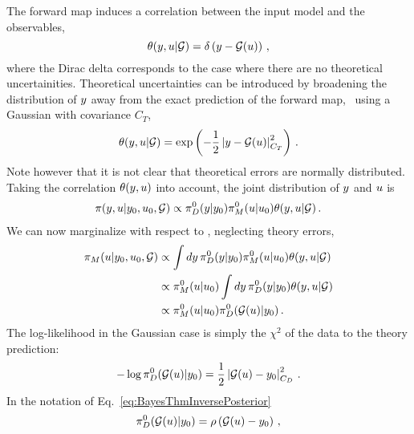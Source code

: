 The forward map induces a correlation between the input model and the
observables, 
\begin{equation}
  \label{eq:ThetaCorr}
  \theta(y,u|\mathcal{G}) = \delta\left(y - \mathcal{G}(u)\right)\, ,
\end{equation}
where the Dirac delta corresponds to the case where there are no theoretical
uncertainities. Theoretical uncertainties can be introduced by broadening the
distribution of $y$ away from the exact prediction of the forward map, \eg\
using a Gaussian with covariance $C_T$,
\begin{equation}
  \label{eq:TheoryErrors}
  \theta(y,u|\mathcal{G}) = \exp\left(
    -\frac12 
    \left| y - \mathcal{G}(u)
    \right|_{C_T}^2\right)\, .
\end{equation}
Note however that it is not clear that theoretical errors are normally
distributed. Taking the correlation $\theta(y,u)$ into account, the joint
distribution of $y$ and $u$ is
\begin{align}
  \label{eq:JointYAndU}
  \pi(y,u|y_0,u_0,\mathcal{G}) \propto 
  \pi_{D}^0(y|y_0) \pi_{M}^0(u|u_0) \theta(y,u|\mathcal{G})\, .
\end{align}
We can now marginalize with respect to \obs, neglecting theory errors, 
\begin{align}
  \label{eq:MarginOne}
  \pi_M(u|y_0,u_0,\mathcal{G}) 
  &\propto \int dy\, \pi_{D}^0(y|y_0) \pi_{M}^0(u|u_0) 
    \theta(y,u|\mathcal{G}) \\
  & \propto \pi_{M}^0(u|u_0)  \int dy\, \pi_{D}^0(y|y_0) 
    \theta(y,u|\mathcal{G}) \\
  & \propto \pi_{M}^0(u|u_0) \pi_{D}^0(\mathcal{G}(u)|y_0)\, .
\end{align}
The log-likelihood in the Gaussian case is simply the $\chi^2$ of the data to
the theory prediction:
\begin{equation}
  \label{eq:LikelyChiSq}
  -\log\pi_D^0(\mathcal{G}(u)|y_0) =  
      \frac12 \left|
      \mathcal{G}(u) - y_0
      \right|_{C_{D}}^2
    \, .
\end{equation}
In the notation of Eq.~\ref{eq:BayesThmInversePosterior}
\begin{equation}
  \label{eq:IdentifyRho}
  \pi_D^0(\mathcal{G}(u)|y_0) = \rho\left(
    \mathcal{G}(u) - y_0
  \right)\, ,
\end{equation}
